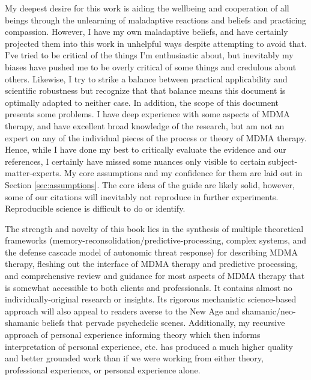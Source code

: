 \documentclass[12pt,letterpaper]{book}
\begin{document}
My deepest desire for this work is aiding the wellbeing and cooperation of all beings through the unlearning of maladaptive reactions and beliefs and practicing compassion. However, I have my own maladaptive beliefs, and have certainly projected them into this work in unhelpful ways despite attempting to avoid that. I've tried to be critical of the things I'm enthusiastic about, but inevitably my biases have pushed me to be overly critical of some things and credulous about others. Likewise, I try to strike a balance between practical applicability and scientific robustness but recognize that that balance means this document is optimally adapted to neither case. In addition, the scope of this document presents some problems. I have deep experience with some aspects of MDMA therapy, and have excellent broad knowledge of the research, but am not an expert on any of the individual pieces of the process or theory of MDMA therapy. Hence, while I have done my best to critically evaluate the evidence and our references, I certainly have missed some nuances only visible to certain subject-matter-experts. My core assumptions and my confidence for them are laid out in Section \ref{sec:assumptions}. The core ideas of the guide are likely solid, however, some of our citations will inevitably not reproduce in further experiments. Reproducible science is difficult to do or identify.


The strength and novelty of this book lies in the synthesis of multiple theoretical frameworks (memory-reconsolidation/predictive-processing, complex systems, and the defense cascade model of autonomic threat response) for describing MDMA therapy, fleshing out the interface of MDMA therapy and predictive processing, and comprehensive review and guidance for most aspects of MDMA therapy that is somewhat accessible to both clients and professionals. It contains almost no individually-original research or insights. Its rigorous mechanistic science-based approach will also appeal to readers averse to the New Age and shamanic/neo-shamanic beliefs that pervade psychedelic scenes. Additionally, my recursive approach of personal experience informing theory which then informs interpretation of personal experience, etc. has produced a much higher quality and better grounded work than if we were working from either theory, professional experience, or personal experience alone.
\end{document}
